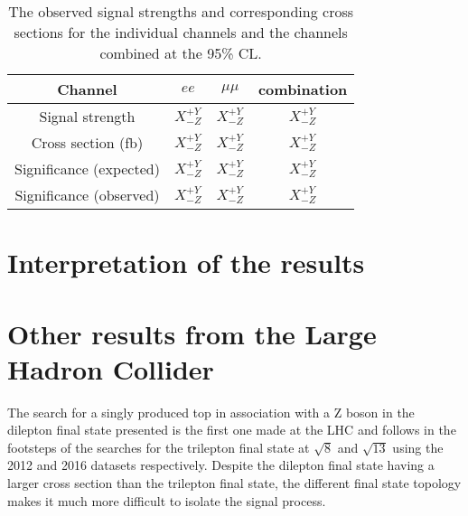\begin{table}[!h]
   \centering
   \caption{The observed signal strengths and corresponding cross sections for
   the individual channels and the channels combined at the 95\% CL.}
   \begin{tabular}{cccc}
       \hline
       Channel & $ee$ & $\mu\mu$ & \textbf{combination} \\
        \hline
        Signal strength & $X_{-Z}^{+Y}$ & $X_{-Z}^{+Y}$ & $X_{-Z}^{+Y}$ \\
       Cross section (fb) & $X_{-Z}^{+Y}$ & $X_{-Z}^{+Y}$ & $X_{-Z}^{+Y}$ \\
       Significance (expected) & $X_{-Z}^{+Y}$ & $X_{-Z}^{+Y}$ & $X_{-Z}^{+Y}$ \\
       Significance (observed) & $X_{-Z}^{+Y}$ & $X_{-Z}^{+Y}$ & $X_{-Z}^{+Y}$ \\
        \hline
    \end{tabular}
   \label{tab:shapetxs}
\end{table}

\section{Interpretation of the results}
\section{Other results from the Large Hadron Collider}
The search for a singly produced top in association with a Z boson in the dilepton final state presented is the first one made at the LHC and follows in the footsteps of the searches for the trilepton final state at $\sqrt{8}$ and $\sqrt{13}$ using the 2012 and 2016 datasets respectively.
Despite the dilepton final state having a larger cross section than the trilepton final state, the different final state topology makes it much more difficult to isolate the signal process.